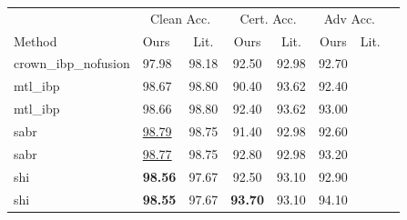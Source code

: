 \begin{tabular}{llcccccc}
\toprule
 & \multicolumn{2}{c}{Clean Acc.} & \multicolumn{2}{c}{Cert. Acc.} & \multicolumn{2}{c}{Adv Acc.} \\
Method & Ours & Lit. & Ours & Lit. & Ours & Lit. \\
\midrule
crown\_ibp\_nofusion & 97.98 & 98.18 & 92.50 & 92.98 & 92.70 & \\
mtl\_ibp & 98.67 & 98.80 & 90.40 & 93.62 & 92.40 & \\
mtl\_ibp & 98.66 & 98.80 & 92.40 & 93.62 & 93.00 & \\
sabr & \underline{98.79} & 98.75 & 91.40 & 92.98 & 92.60 & \\
sabr & \underline{98.77} & 98.75 & 92.80 & 92.98 & 93.20 & \\
shi & \textbf{98.56} & 97.67 & 92.50 & 93.10 & 92.90 & \\
shi & \textbf{98.55} & 97.67 & \textbf{93.70} & 93.10 & 94.10 & \\
\bottomrule
\end{tabular}